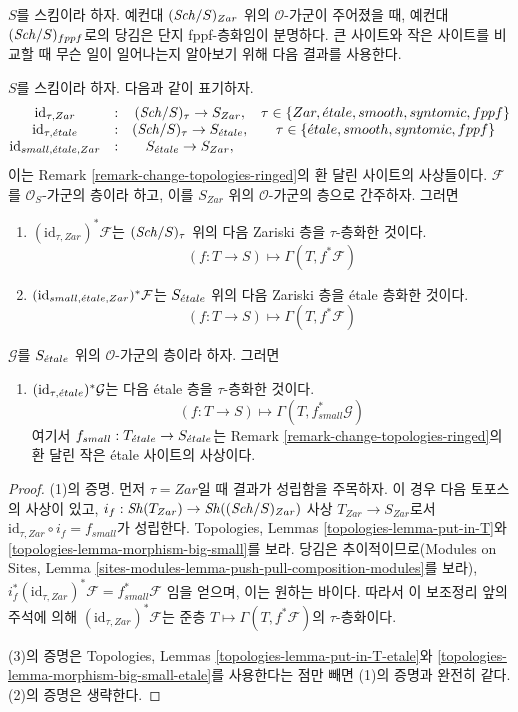 \noindent
$S$를 스킴이라 하자. 예컨대 $(\mathit{Sch}/S)_{Zar}$ 위의
$\mathcal{O}$-가군이 주어졌을 때, 예컨대 $(\mathit{Sch}/S)_{fppf}$로의 당김은
단지 fppf-층화임이 분명하다. 큰 사이트와 작은 사이트를 비교할 때
무슨 일이 일어나는지 알아보기 위해 다음 결과를 사용한다.

\begin{lemma}
\label{lemma-compare-sites}
$S$를 스킴이라 하자. 다음과 같이 표기하자.
$$
\begin{matrix}
\text{id}_{\tau, Zar} & : & (\mathit{Sch}/S)_\tau \to S_{Zar}, &
\tau \in \{Zar, {\acute{e}tale}, smooth, syntomic, fppf\} \\
\text{id}_{\tau, {\acute{e}tale}} & : &
(\mathit{Sch}/S)_\tau \to S_{\acute{e}tale}, &
\tau \in \{{\acute{e}tale}, smooth, syntomic, fppf\} \\
\text{id}_{small, {\acute{e}tale}, Zar} & : & S_{\acute{e}tale} \to S_{Zar},
\end{matrix}
$$
이는 Remark \ref{remark-change-topologies-ringed}의 환 달린 사이트의
사상들이다. $\mathcal{F}$를 $\mathcal{O}_S$-가군의 층이라 하고,
이를 $S_{Zar}$ 위의 $\mathcal{O}$-가군의 층으로 간주하자. 그러면
\begin{enumerate}
\item $(\text{id}_{\tau, Zar})^*\mathcal{F}$는 $(\mathit{Sch}/S)_\tau$ 위의
다음 Zariski 층을 $\tau$-층화한 것이다.
$$
(f : T \to S) \longmapsto \Gamma(T, f^*\mathcal{F})
$$
\item $(\text{id}_{small, {\acute{e}tale}, Zar})^*\mathcal{F}$는 $S_{\acute{e}tale}$ 위의
다음 Zariski 층을 \'etale 층화한 것이다.
$$
(f : T \to S) \longmapsto \Gamma(T, f^*\mathcal{F})
$$
\end{enumerate}
$\mathcal{G}$를 $S_{\acute{e}tale}$ 위의 $\mathcal{O}$-가군의 층이라 하자. 그러면
\begin{enumerate}
\item[(3)] $(\text{id}_{\tau, {\acute{e}tale}})^*\mathcal{G}$는 다음
\'etale 층을 $\tau$-층화한 것이다.
$$
(f : T \to S) \longmapsto \Gamma(T, f_{small}^*\mathcal{G})
$$
여기서 $f_{small} : T_{\acute{e}tale} \to S_{\acute{e}tale}$는 Remark
\ref{remark-change-topologies-ringed}의 환 달린 작은 \'etale 사이트의 사상이다.
\end{enumerate}
\end{lemma}

\begin{proof}
(1)의 증명. 먼저 $\tau = Zar$일 때 결과가 성립함을 주목하자.
이 경우 다음 토포스의 사상이 있고,
$i_f : \mathop{\mathit{Sh}}\nolimits(T_{Zar}) \to \mathop{\mathit{Sh}}\nolimits((\mathit{Sch}/S)_{Zar})$
사상 $T_{Zar} \to S_{Zar}$로서
$\text{id}_{\tau, Zar} \circ i_f = f_{small}$가 성립한다. Topologies, Lemmas
\ref{topologies-lemma-put-in-T}와
\ref{topologies-lemma-morphism-big-small}를 보라.
당김은 추이적이므로(Modules on Sites, Lemma
\ref{sites-modules-lemma-push-pull-composition-modules}를 보라),
$i_f^*(\text{id}_{\tau, Zar})^*\mathcal{F} = f_{small}^*\mathcal{F}$
임을 얻으며, 이는 원하는 바이다. 따라서 이 보조정리 앞의 주석에 의해
$(\text{id}_{\tau, Zar})^*\mathcal{F}$는 준층
$T \mapsto \Gamma(T, f^*\mathcal{F})$의 $\tau$-층화이다.

\medskip\noindent
(3)의 증명은 Topologies, Lemmas
\ref{topologies-lemma-put-in-T-etale}와
\ref{topologies-lemma-morphism-big-small-etale}를 사용한다는 점만 빼면
(1)의 증명과 완전히 같다. (2)의 증명은 생략한다.
\end{proof}

